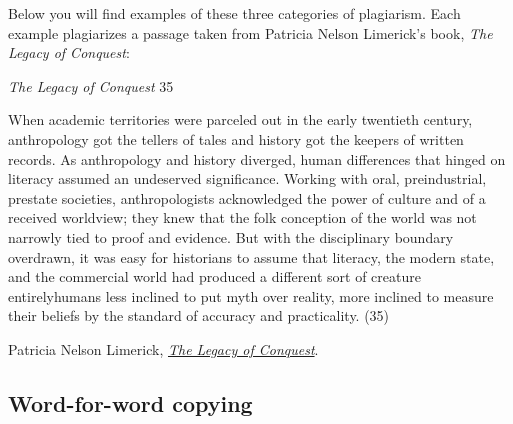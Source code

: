 Below you will find examples of these three categories of plagiarism. Each example plagiarizes a passage taken from Patricia Nelson Limerick's book, \emph{The Legacy of Conquest}:\bigskip

\begin{tcolorbox}[enhanced,width=4.2in,left=.4in, right=.4in,
   drop fuzzy shadow southeast,
    boxrule=0.4pt,sharp corners,colframe=black!80!black,colback=white!10]

\smallskip

\begin{flushright}


{\economica \emph{The Legacy of Conquest} \hspace{6pt} 35 }

\end{flushright}

{\small
\begin{doublespacing}

\hspace{.5cm}When academic territories were parceled out in the early twentieth century,
anthropology got the tellers of tales and history got the keepers of written
records. As anthropology and history diverged, human differences that
hinged on literacy assumed an undeserved significance. Working with oral,
preindustrial, prestate societies, anthropologists acknowledged the power
of culture and of a received worldview; they knew that the folk conception
of the world was not narrowly tied to proof and evidence.  But with the
disciplinary boundary overdrawn, it was easy for historians to assume that
literacy, the modern state, and the commercial world had produced a different
sort of creature entirely\textemdash humans less inclined to put myth over reality,
more inclined to measure their beliefs by the standard of accuracy and
practicality. (35)

\bigskip

\noindent\textemdash Patricia Nelson Limerick, \href{http://libcat.dartmouth.edu/record=b1422593~S1}{\emph{The Legacy of Conquest}}.

\bigskip

\end{doublespacing}}

\end{tcolorbox}


\subsection{Word-for-word copying}

